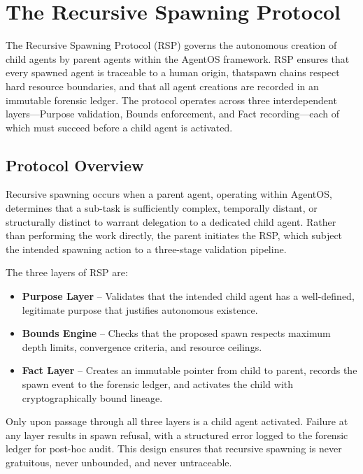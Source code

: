 \section{The Recursive Spawning Protocol}
\label{section:recursive-spawning-protocol}

The Recursive Spawning Protocol (RSP) governs the autonomous creation of child agents by parent agents within the AgentOS framework. RSP ensures that every spawned agent is traceable to a human origin, thatspawn chains respect hard resource boundaries, and that all agent creations are recorded in an immutable forensic ledger. The protocol operates across three interdependent layers---Purpose validation, Bounds enforcement, and Fact recording---each of which must succeed before a child agent is activated.

\subsection{Protocol Overview}
\label{subsection:protocol-overview}

Recursive spawning occurs when a parent agent, operating within AgentOS, determines that a sub-task is sufficiently complex, temporally distant, or structurally distinct to warrant delegation to a dedicated child agent. Rather than performing the work directly, the parent initiates the RSP, which subject the intended spawning action to a three-stage validation pipeline.

The three layers of RSP are:

\begin{itemize}
    \item \textbf{Purpose Layer} -- Validates that the intended child agent has a well-defined, legitimate purpose that justifies autonomous existence.
    \item \textbf{Bounds Engine} -- Checks that the proposed spawn respects maximum depth limits, convergence criteria, and resource ceilings.
    \item \textbf{Fact Layer} -- Creates an immutable pointer from child to parent, records the spawn event to the forensic ledger, and activates the child with cryptographically bound lineage.
\end{itemize}

Only upon passage through all three layers is a child agent activated. Failure at any layer results in spawn refusal, with a structured error logged to the forensic ledger for post-hoc audit. This design ensures that recursive spawning is never gratuitous, never unbounded, and never untraceable.

